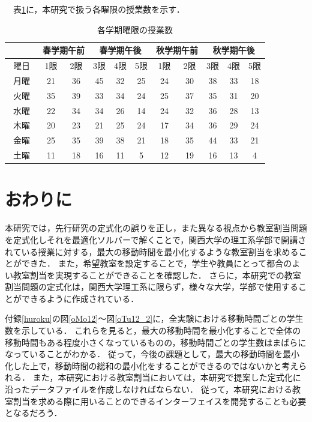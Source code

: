 \documentclass[12pt, a4paper, fleqn]{jreport}
\begin{document}
\begin{itemize}
　表\ref{k:normal_information}に，本研究で扱う各曜限の授業数を示す．
\begin{table}[H]
\caption{各学期曜限の授業数}
\label{k:normal_information}
\begin{center}
\begin{tabular}{c|cc|ccc|cc|ccc}
\hline
 & \multicolumn{2}{|c}{春学期午前} &\multicolumn{3}{|c}{春学期午後} &\multicolumn{2}{|c}{秋学期午前} &\multicolumn{3}{|c}{秋学期午後} \\
\hline
曜日　& 1限 & 2限 & 3限 & 4限 & 5限 &  1限 & 2限 & 3限 & 4限 & 5限\\
\hline
月曜  & 21  & 36  & 45 & 32  & 25  & 24  & 30 & 38  & 33 & 18 \\
火曜  & 35  & 39  & 33 & 34  & 24  & 25  & 37 & 35  & 31 & 20 \\
水曜  & 22  & 34  & 34 & 26  & 14  & 24  & 32 & 36  & 28 & 13 \\
木曜  & 20  & 23  & 21 & 25  & 24  & 17  & 34 & 36  & 29 & 24 \\
金曜  & 25  & 35  & 39 & 38  & 21  & 18  & 35 & 44  & 33 & 21 \\
土曜  & 11  & 18  & 16 & 11  & 5   & 12  & 19 & 16  & 13 & 4  \\
\hline
\end{tabular}
\end{center}
\end{table}





\end{itemize}






\chapter{おわりに}
本研究では，先行研究\cite{先行研究}の定式化の誤りを正し，また異なる視点から教室割当問題を定式化しそれを最適化ソルバーで解くことで，関西大学の理工系学部で開講されている授業に対する，最大の移動時間を最小化するような教室割当を求めることができた．
また，希望教室を設定することで，学生や教員にとって都合のよい教室割当を実現することができることを確認した．
さらに，本研究での教室割当問題の定式化は，関西大学理工系に限らず，様々な大学，学部で使用することができるように作成されている．

付録\ref{huroku}の図\ref{oMo12}～図\ref{oTu12_2}に，全実験における移動時間ごとの学生数を示している．
これらを見ると，最大の移動時間を最小化することで全体の移動時間もある程度小さくなっているものの，移動時間ごとの学生数はまばらになっていることがわかる．
従って，今後の課題として，最大の移動時間を最小化した上で，移動時間の総和の最小化をすることができるのではないかと考えられる．
また，本研究における教室割当においては，本研究で提案した定式化に沿ったデータファイルを作成しなければならない．
従って，本研究における教室割当を求める際に用いることのできるインターフェイスを開発することも必要となるだろう．
\end{document}
